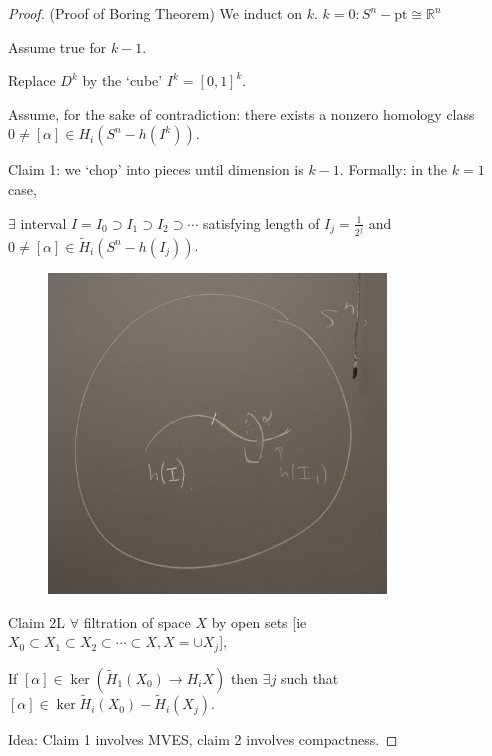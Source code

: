 \documentclass{article}
\theoremstyle{definition}
\begin{document}
    \begin{proof}
        (Proof of Boring Theorem) We induct on \(k\). \(k = 0: S^n - \text{pt} \cong \mathbb{R}^n\)

        Assume true for \(k-1\).

        Replace \(D^k\) by the `cube' \(I^k  = [0,1]^k\).

        Assume, for the sake of contradiction: there exists a nonzero homology class \(0 \neq [\alpha] \in H_i(S^n - h(I^k))\).

        Claim 1: we `chop' into pieces until dimension is \(k-1\). Formally: in the \(k=1\) case,

        \(\exists\) interval \(I = I_0 \supset I_1 \supset I_2 \supset \cdots\) satisfying length of \(I_j = \frac{1}{2^j}\) and \(0 \neq [\alpha] \in \widetilde{H}_i (S^n - h(I_j))\).

        \begin{figure}[H]
            \centering
            \includegraphics[width=0.8\textwidth]{img/intervals}
        \end{figure}

        Claim 2L \(\forall\) filtration of space \(X\) by open sets [ie \(X_0 \subset X_1 \subset X_2 \subset \cdots \subset X, X = \cup X_j\)],

        If \([\alpha] \in \ker (\widetilde{H}_1(X_0) \to H_i X)\) then \(\exists j\) such that \([\alpha] \in \ker \widetilde{H}_i(X_0) - \widetilde{H}_i(X_j)\). 

        Idea: Claim 1 involves MVES, claim 2 involves compactness.


\end{proof}
\end{document}
